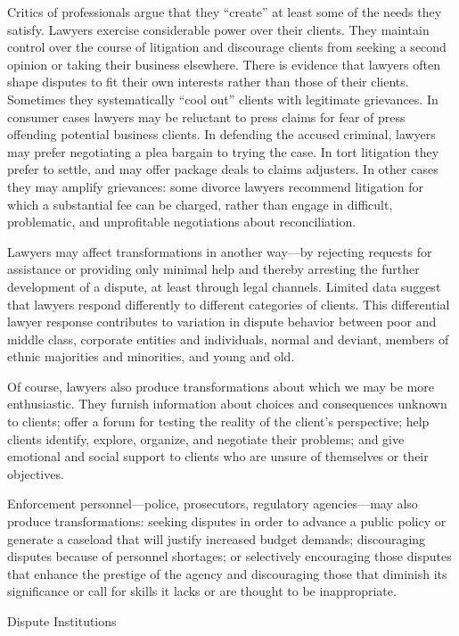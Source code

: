 \documentclass[11pt,letterpaper,twoside]{article}
\begin{document}
Critics of professionals argue that they ``create'' at least some of the
needs they satisfy. Lawyers exercise considerable power over their
clients. They maintain control over the course of litigation and
discourage clients from seeking a second opinion or taking their
business elsewhere. There is evidence that lawyers often shape disputes
to fit their own interests rather than those of their clients. Sometimes
they systematically ``cool out'' clients with legitimate grievances. In
consumer cases lawyers may be reluctant to press claims for fear of
press offending potential business clients. In defending the accused
criminal, lawyers may prefer negotiating a plea bargain to trying the
case. In tort litigation they prefer to settle, and may offer package
deals to claims adjusters. In other cases they may amplify grievances:
some divorce lawyers recommend litigation for which a substantial fee
can be charged, rather than engage in difficult, problematic, and
unprofitable negotiations about reconciliation.

Lawyers may affect transformations in another way---by rejecting
requests for assistance or providing only minimal help and thereby
arresting the further development of a dispute, at least through legal
channels. Limited data suggest that lawyers respond differently to
different categories of clients. This differential lawyer response
contributes to variation in dispute behavior between poor and middle
class, corporate entities and individuals, normal and deviant, members
of ethnic majorities and minorities, and young and old.

Of course, lawyers also produce transformations about which we may be
more enthusiastic. They furnish information about choices and
consequences unknown to clients; offer a forum for testing the reality
of the client's perspective; help clients identify, explore, organize,
and negotiate their problems; and give emotional and social support to
clients who are unsure of themselves or their objectives.

Enforcement personnel---police, prosecutors, regulatory agencies---may
also produce transformations: seeking disputes in order to advance a
public policy or generate a caseload that will justify increased budget
demands; discouraging disputes because of personnel shortages; or
selectively encouraging those disputes that enhance the prestige of the
agency and discouraging those that diminish its significance or call for
skills it lacks or are thought to be inappropriate.

{Dispute Institutions}
\end{document}
